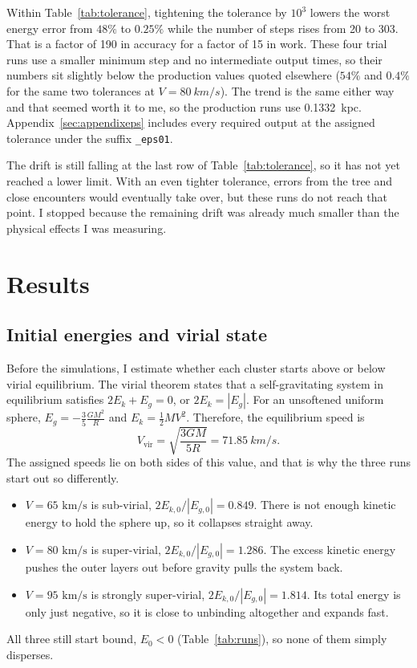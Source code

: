 \documentclass[12pt,a4paper]{article}
\newcommand{\abs}[1]{\left|#1\right|}
\begin{document}
Within Table~\ref{tab:tolerance}, tightening the tolerance by $10^3$ lowers the
worst energy error from $48\%$ to $0.25\%$ while the number of steps rises from
20 to 303. That is a factor of 190 in accuracy for a factor of 15 in work. These
four trial runs use a smaller minimum step and no intermediate output times, so
their numbers sit slightly below the production values quoted elsewhere ($54\%$
and $0.4\%$ for the same two tolerances at $V=\SI{80}{km/s}$). The trend is the
same either way and that seemed worth it to me, so the production runs use
\SI{0.1332}{kpc}.
Appendix~\ref{sec:appendixeps} includes every required output at the assigned
tolerance under the suffix \texttt{\_eps01}.

The drift is still falling at the last row of Table~\ref{tab:tolerance}, so it
has not yet reached a lower limit. With an even tighter tolerance, errors from
the tree and close encounters would eventually take over, but these runs do not
reach that point. I stopped because the remaining drift was already much smaller
than the physical effects I was measuring.

\section{Results}\label{sec:results}

\subsection{Initial energies and virial state}

Before the simulations, I estimate whether each cluster starts above or below
virial equilibrium. The virial theorem states that a self-gravitating system
in equilibrium satisfies $2E_k+E_g=0$, or $2E_k=\abs{E_g}$. For an
unsoftened uniform sphere, $E_g=-\frac{3}{5}\frac{GM^2}{R}$ and
$E_k=\frac12 MV^2$. Therefore, the equilibrium speed is
\begin{equation}
    V_{\mathrm{vir}}=\sqrt{\frac{3GM}{5R}}=\SI{71.85}{km/s}.
\end{equation}
The assigned speeds lie on both sides of this value, and that is why the three
runs start out so differently.
\begin{itemize}
    \item $V=65\text{ km/s}$ is sub-virial, $2E_{k,0}/\abs{E_{g,0}} = 0.849$. There is not enough kinetic energy to hold the sphere up, so it collapses straight away.
    \item $V=80\text{ km/s}$ is super-virial, $2E_{k,0}/\abs{E_{g,0}} = 1.286$. The excess kinetic energy pushes the outer layers out before gravity pulls the system back.
    \item $V=95\text{ km/s}$ is strongly super-virial, $2E_{k,0}/\abs{E_{g,0}} = 1.814$. Its total energy is only just negative, so it is close to unbinding altogether and expands fast.
\end{itemize}
All three still start bound, $E_0 < 0$ (Table~\ref{tab:runs}), so none of them simply disperses.
\end{document}
